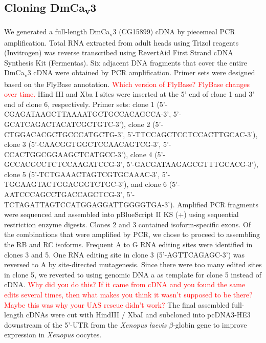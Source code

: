 \subsection*{Cloning DmCa\textsubscript{v}3}

We generated a full-length DmCa\textsubscript{v}3 (CG15899) cDNA by piecemeal PCR amplification.
Total RNA extracted from adult heads using Trizol reagents (Invitrogen) was reverse transcribed using RevertAid First Strand cDNA Synthesis Kit (Fermentas).
Six adjacent DNA fragments that cover the entire DmCa\textsubscript{v}3 cDNA were obtained by PCR amplification. 
Primer sets were designed based on the FlyBase annotation. \textcolor{red}{Which version of FlyBase? FlyBase changes over time.}
Hind III and Xba I sites were inserted at the 5' end of clone 1 and 3' end of clone 6, respectively.
Primer sets: clone 1 (5'-CGAGATAAGCTTAAAATGCTGCCACAGCCA-3', 5'-GCATCAGACTACATCGCTGTC-3'), clone 2 (5'-CTGGACACGCTGCCCATGCTG-3', 5'-TTCCAGCTCCTCCACTTGCAC-3'), clone 3 (5'-CAACGGTGGCTCCAACAGTCG-3', 5'-CCACTGGCGGAAGCTCATGCC-3'), clone 4 (5'-GCCACGCCTCTCCAAGATCCG-3', 5'-GACGATAAGAGCGTTTGCACG-3'), clone 5 (5'-TCTGAAACTAGTCGTGCAAAC-3', 5'-TGGAAGTACTGGACGGTCTGC-3'), and clone 6 (5'-AATCCCAGCCTGACCAGCTCG-3', 5'-TCTAGATTAGTCCATGGAGGATTGGGGTGA-3').
Amplified PCR fragments were sequenced and assembled into pBlueScript II KS (+) using sequential restriction enzyme digests.
Clones 2 and 3 contained isoform-specific exons.
Of the combinations that were amplified by PCR, we chose to proceed to assembling the RB and RC isoforms.
Frequent A to G RNA editing sites were identified in clones 3 and 5.
One RNA editing site in clone 3 (5'-AGTTCAGAGC-3') was reversed to A by site-directed mutagenesis.
Since there were too many edited sites in clone 5, we reverted to using genomic DNA a as template for clone 5 instead of cDNA.
\textcolor{red}{Why did you do this? If it came from cDNA and you found the same edits several times, then what makes you think it wasn't supposed to be there? Maybe this was why your UAS rescue didn't work?}
The final assembled full-length cDNAs were cut with HindIII / XbaI and subcloned into pcDNA3-HE3 downstream of the 5'-UTR from the \emph{Xenopus laevis} $\beta$-globin gene to improve expression in \emph{Xenopus} oocytes.

